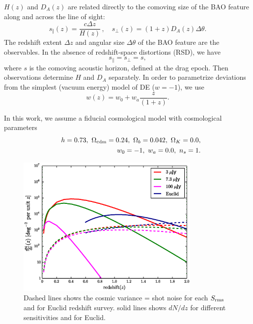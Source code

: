 \documentclass[useAMS,usenatbib]{mn2e}
\begin{document}
$H(z)$ and $D_{A}(z)$ are related directly to the comoving size of the BAO feature along and across the line of sight: 
\begin{equation}\label{DandH}
s_\Vert(z) =\frac{c \Delta z}{H(z)}\,,  \quad s_\perp(z) = (1+z) D_{A}(z) \Delta \theta.
\end{equation}
The redshift extent $\Delta z$ and angular size $\Delta \theta$ of the BAO feature are the observables. In the absence of redshift-space distortions (RSD), we have
\begin{equation}
s_\|=s_\perp=s,
\end{equation} 
where $s$ is the comoving acoustic horizon, defined at the drag epoch. Then observations determine $H$ and $D_A$ separately.
 In order to parametrize deviations from the simplest (vacuum energy) model of DE ($w=-1$), we use \citep{Chevallier:2000qy, Linder:2003nc} \begin{equation}
w(z) = w_0 + w_a \frac{z}{(1+z)}.
\label{wz}
\end{equation}

In this work, we assume a fiducial cosmological model with  cosmological parameters 
\begin{eqnarray}
&& h=0.73,~\Omega_{{\rm cdm}} = 0.24,~ \Omega_b= 0.042,~\Omega_K= 0.0, \nonumber\\ &&w_0= -1,~w_a = 0.0,~n_s=1. \label{cospar}
\end{eqnarray}

\begin{figure}
\begin{center}
\includegraphics[width=0.8\textwidth]{plots/cosmic_Variance.eps}
\caption{Dashed lines shows the cosmic variance = shot noise for each $S_{\rm rms}$ and for Euclid redshift survey. solid lines shows $dN/dz$ for different sensitivities and for Euclid.}
\label{fig:cosmic_variance}
\end{center}
\end{figure}
\end{document}
